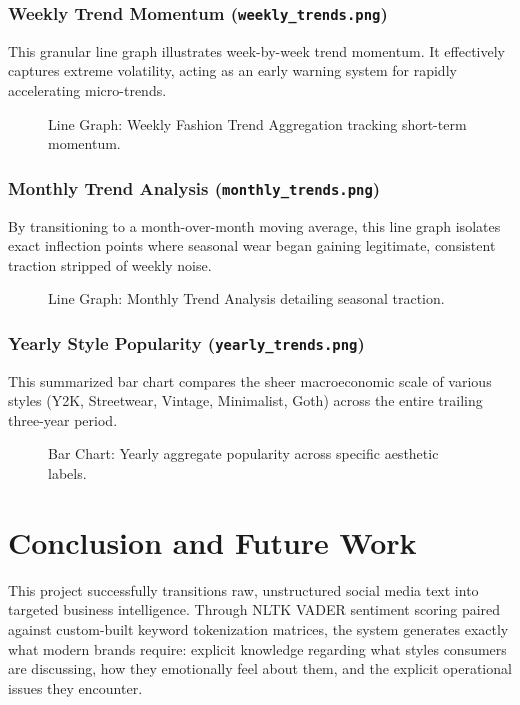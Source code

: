 \documentclass[conference]{IEEEtran}
\begin{document}
\subsubsection{Weekly Trend Momentum (\texttt{weekly\_trends.png})}
This granular line graph illustrates week-by-week trend momentum. It effectively captures extreme volatility, acting as an early warning system for rapidly accelerating micro-trends.

\begin{figure}[htbp]
\centering
\fbox{\rule{0pt}{2in} \rule{0.9\linewidth}{0pt}}
\caption{Line Graph: Weekly Fashion Trend Aggregation tracking short-term momentum.}
\label{fig:weekly}
\end{figure}

\subsubsection{Monthly Trend Analysis (\texttt{monthly\_trends.png})}
By transitioning to a month-over-month moving average, this line graph isolates exact inflection points where seasonal wear began gaining legitimate, consistent traction stripped of weekly noise.

\begin{figure}[htbp]
\centering
\fbox{\rule{0pt}{2in} \rule{0.9\linewidth}{0pt}}
\caption{Line Graph: Monthly Trend Analysis detailing seasonal traction.}
\label{fig:monthly}
\end{figure}

\subsubsection{Yearly Style Popularity (\texttt{yearly\_trends.png})}
This summarized bar chart compares the sheer macroeconomic scale of various styles (Y2K, Streetwear, Vintage, Minimalist, Goth) across the entire trailing three-year period.

\begin{figure}[htbp]
\centering
\fbox{\rule{0pt}{2in} \rule{0.9\linewidth}{0pt}}
\caption{Bar Chart: Yearly aggregate popularity across specific aesthetic labels.}
\label{fig:yearly}
\end{figure}

\section{Conclusion and Future Work}
\label{sec:conclusion}
This project successfully transitions raw, unstructured social media text into targeted business intelligence. Through NLTK VADER sentiment scoring paired against custom-built keyword tokenization matrices, the system generates exactly what modern brands require: explicit knowledge regarding what styles consumers are discussing, how they emotionally feel about them, and the explicit operational issues they encounter.
\end{document}
